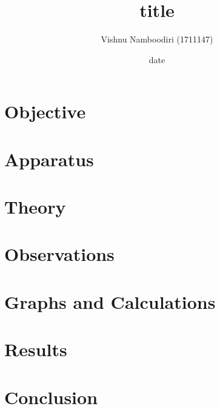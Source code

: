 \documentclass[a4paper]{article}
\title{\textbf{~title~}}
\author{Vishnu Namboodiri (1711147)}
\date{~date~}
\begin{document}
\maketitle



\section*{Objective}




\section*{Apparatus}





\section*{Theory}



\section*{Observations}





\section*{Graphs and Calculations}



\section*{Results}


\section*{Conclusion}
\end{document}
